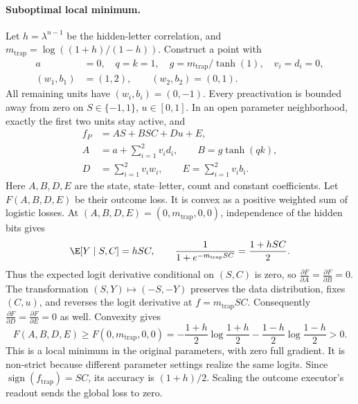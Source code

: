 \paragraph{Suboptimal local minimum.}
Let $h=\lambda^{n-1}$ be the hidden-letter correlation, and $m_{\mathrm{trap}}=\log((1+h)/(1-h))$. Construct a point with
\[
\begin{aligned}
 a&=0,\quad q=k=1,\quad g=m_{\mathrm{trap}}/\tanh(1),\quad v_i=d_i=0,\\
 (w_1,b_1)&=(1,2),\qquad (w_2,b_2)=(0,1).
\end{aligned}
\]
All remaining units have $(w_i,b_i)=(0,-1)$. Every preactivation is bounded
away from zero on $S\in\{-1,1\}$, $u\in[0,1]$. In an open parameter neighborhood,
exactly the first two units stay active, and
\[
\begin{aligned}
 f_P&=A S+B SC+D u+E,\\
 A&=a+\sum_{i=1}^2v_i d_i,\qquad B=g\tanh(qk),\\
 D&=\sum_{i=1}^2v_i w_i,\qquad E=\sum_{i=1}^2v_i b_i.
\end{aligned}
\]
Here $A,B,D,E$ are the state, state--letter, count and constant coefficients.
Let $F(A,B,D,E)$ be their outcome loss.
It is convex as a positive weighted sum of logistic losses. At
$(A,B,D,E)=(0,m_{\mathrm{trap}},0,0)$, independence of the hidden bits gives
\[
 \E[Y\mid S,C]=hSC,
 \qquad \frac{1}{1+e^{-m_{\mathrm{trap}}SC}}=\frac{1+hSC}{2}.
\]
Thus the expected logit derivative conditional on $(S,C)$ is zero, so
$\frac{\partial F}{\partial A}=\frac{\partial F}{\partial B}=0$.
The transformation $(S,Y)\mapsto(-S,-Y)$ preserves the data distribution,
fixes $(C,u)$, and reverses the logit derivative at $f=m_{\mathrm{trap}}SC$.
Consequently $\frac{\partial F}{\partial D}=\frac{\partial F}{\partial E}=0$ as well.
Convexity gives
\begin{equation}
 F(A,B,D,E)\ge F(0,m_{\mathrm{trap}},0,0)
 =-\frac{1+h}{2}\log\frac{1+h}{2}
  -\frac{1-h}{2}\log\frac{1-h}{2}>0.
 \label{eq:two-path-local-loss}
\end{equation}
This is a local minimum in the original parameters, with zero full gradient.
It is non-strict because different parameter settings realize the same logits.
Since $\operatorname{sign}(f_{\mathrm{trap}})=SC$, its accuracy is $(1+h)/2$.
Scaling the outcome executor's readout sends the global loss to zero.

